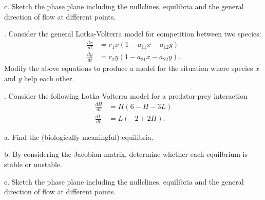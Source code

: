 \documentclass[reqno,12pt]{amsart}
\def\dxdt{\frac{dx}{dt}}
\def\dydt{\frac{dy}{dt}}
\def\dHdt{\frac{dH}{dt}}
\def\dLdt{\frac{dL}{dt}}
\begin{document}
\noindent
c.  Sketch the phase plane including the nullclines, equilibria
and the general direction of flow at different points.

\vspace{1cm}

.  Consider the general Lotka-Volterra model for competition
between two species:
\begin{equation*}
\begin{aligned}
\dxdt &= r_1 x (1 - a_{11} x - a_{12} y)	\\
\dydt &= r_2 y (1 - a_{21} x - a_{22} y).
\end{aligned}
\end{equation*}
Modify the above equations to produce a model for the situation
where species $x$ and $y$ help each other.

\vspace{1cm}

.  Consider the following Lotka-Volterra model for a predator-prey
interaction
\begin{equation*}
\begin{aligned}
\dHdt &= H ( 6 -   H - 3 L)	\\
\dLdt &= L (-2 + 2 H).
\end{aligned}
\end{equation*}

\noindent
a.  Find the (biologically meaningful) equilibria.

\noindent
b.  By considering the Jacobian matrix, determine whether each
equilbrium is stable or unstable.

\noindent
c.  Sketch the phase plane including the nullclines, equilibria
and the general direction of flow at different points.

\vspace{1cm}
\end{document}
